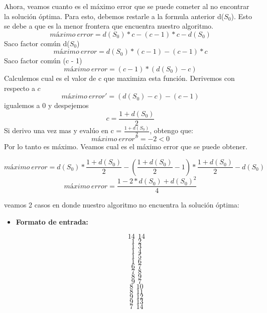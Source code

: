 \begin{itemize}
Ahora, veamos cuanto es el máximo error que se puede cometer al no encontrar la solución óptima. Para esto, debemos restarle a la formula anterior d($S_{0}$). Esto se debe a que es la menor frontera que encuentra nuestro algoritmo.
\begin{equation}
  máximo\ error = d(S_{0}) * c - (c - 1) * c - d(S_{0}) 
\end{equation} 
Saco factor común d($S_{0}$)
\begin{equation}
  máximo\ error = d(S_{0}) * (c - 1) - (c - 1) * c 
\end{equation} 
Saco factor común (c - 1)
\begin{equation}
  máximo\ error = (c - 1) * (d(S_{0}) - c) 
\end{equation} 
Calculemos cual es el valor de c que maximiza esta función. Derivemos con respecto a $c$
\begin{equation}
  máximo\ error' = (d(S_{0}) - c) - (c - 1)
\end{equation} 
igualemos a 0 y despejemos
\begin{equation}
  c = \frac{1 + d(S_{0})}{2}
\end{equation} 
Si derivo una vez mas y evalúo en c = $\frac{1 + d(S_{0})}{2}$, obtengo que:
\begin{equation}
  máximo\ error'' = -2 < 0
\end{equation}
Por lo tanto es máximo.\newline \newline
Veamos cual es el máximo error que se puede obtener.

\begin{equation}
  máximo\ error = d(S_{0}) * \frac{1 + d(S_{0})}{2} - (\frac{1 + d(S_{0})}{2} - 1) * \frac{1 + d(S_{0})}{2} - d(S_{0}) 
\end{equation} 
\begin{equation}
  máximo\ error = \frac{1 - 2 * d(S_{0}) + d(S_{0})^{2}}{4} 
\end{equation}

veamos 2 casos en donde nuestro algoritmo no encuentra la solución óptima:
\begin {itemize}
\item
\textbf{Formato de entrada:}

$$14\ \  14$$
$$1\ \  2$$
$$1\ \  3$$
$$1\ \  4$$
$$1\ \  5$$
$$1\ \  6$$
$$6\ \  7$$
$$7 \ \ 8$$
$$8\ \  9$$
$$9\ \  7$$
$$8\ \  10$$
$$8\ \  11$$
$$9\ \  12$$
$$9\ \  13$$
$$7\ \  14$$



\end{itemize}
\end{itemize}
